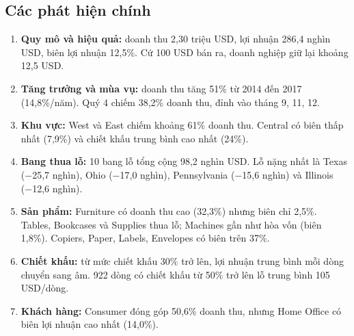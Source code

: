 \documentclass[12pt,a4paper]{article}
\begin{document}
\subsection{Các phát hiện chính}
\begin{enumerate}
  \item \textbf{Quy mô và hiệu quả:} doanh thu 2,30 triệu USD, lợi nhuận 286,4 nghìn USD, biên lợi nhuận 12,5\%.
        Cứ 100 USD bán ra, doanh nghiệp giữ lại khoảng 12,5 USD.
  \item \textbf{Tăng trưởng và mùa vụ:} doanh thu tăng 51\% từ 2014 đến 2017 (14,8\%/năm). Quý 4 chiếm 38,2\%
        doanh thu, đỉnh vào tháng 9, 11, 12.
  \item \textbf{Khu vực:} West và East chiếm khoảng 61\% doanh thu. Central có biên thấp nhất (7,9\%) và chiết khấu
        trung bình cao nhất (24\%).
  \item \textbf{Bang thua lỗ:} 10 bang lỗ tổng cộng 98,2 nghìn USD. Lỗ nặng nhất là Texas (−25,7 nghìn), Ohio (−17,0 nghìn),
        Pennsylvania (−15,6 nghìn) và Illinois (−12,6 nghìn).
  \item \textbf{Sản phẩm:} Furniture có doanh thu cao (32,3\%) nhưng biên chỉ 2,5\%. Tables, Bookcases và Supplies thua lỗ;
        Machines gần như hòa vốn (biên 1,8\%). Copiers, Paper, Labels, Envelopes có biên trên 37\%.
  \item \textbf{Chiết khấu:} từ mức chiết khấu 30\% trở lên, lợi nhuận trung bình mỗi dòng chuyển sang âm.
        922 dòng có chiết khấu từ 50\% trở lên lỗ trung bình 105 USD/dòng.
  \item \textbf{Khách hàng:} Consumer đóng góp 50,6\% doanh thu, nhưng Home Office có biên lợi nhuận cao nhất (14,0\%).
\end{enumerate}
\end{document}
